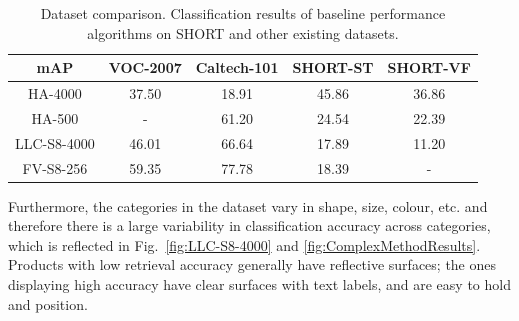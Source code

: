 \begin{table}
\begin{center}
    \begin{tabular}{ccccc}
    \toprule
    mAP & VOC-2007 & Caltech-101 & SHORT-ST & SHORT-VF \\
	\midrule
    HA-4000                    & 37.50    & 18.91       & 45.86       & 36.86 \\
    HA-500                     & -        & 61.20       & 24.54       & 22.39       \\
    LLC-S8-4000                & 46.01    & 66.64       & 17.89       & 11.20       \\
    FV-S8-256                  & 59.35    & 77.78       & 18.39       & -           \\
	\bottomrule
    \end{tabular}
	\end{center}
    \caption{Dataset comparison. Classification results of baseline performance algorithms on SHORT and other existing datasets.}
    \label{table:dataset_comparison}
\end{table}


Furthermore, the categories in the dataset vary in shape, size, colour, etc. and therefore there is a large variability in classification accuracy across categories, which is reflected in Fig.~\ref{fig:LLC-S8-4000} and \ref{fig:ComplexMethodResults}. Products with low retrieval accuracy generally have reflective surfaces; the ones displaying high accuracy have clear surfaces with text labels, and are easy to hold and position. 



